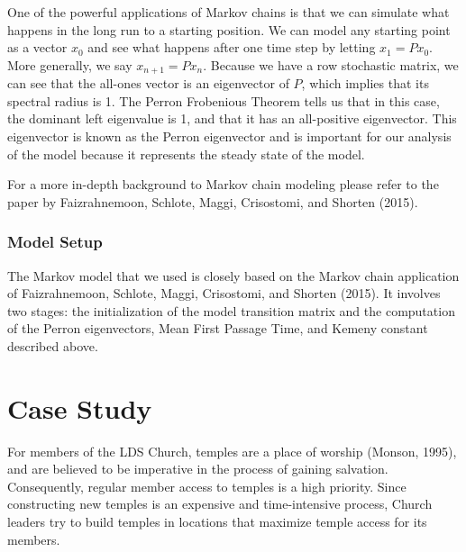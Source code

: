 \documentclass[twoside,twocolumn]{article}
\begin{document}
One of the powerful applications of Markov chains is that we can simulate what happens in the long run to a starting position.
We can model any starting point as a vector $x_0$ and see what happens after one time step by letting $x_1 = P x_0$.
More generally, we say $x_{n + 1} = P x_n$.
Because we have a row stochastic matrix, we can see that the all-ones vector is an eigenvector of $P$, which implies that its spectral radius is 1.
The Perron Frobenious Theorem tells us that in this case, the dominant left eigenvalue is 1, and that it has an all-positive eigenvector.
This eigenvector is known as the Perron eigenvector and is important for our analysis of the model because it represents the steady state of the model.

For a more in-depth background to Markov chain modeling please refer to the paper by Faizrahnemoon, Schlote, Maggi, Crisostomi, and Shorten (2015).

\subsubsection{Model Setup}

The Markov model that we used is closely based on the Markov chain application of Faizrahnemoon, Schlote, Maggi, Crisostomi, and Shorten (2015).
It involves two stages: the initialization of the model transition matrix and the computation of the Perron eigenvectors, Mean First Passage Time, and Kemeny constant described above. %








\section{Case Study}

For members of the LDS Church, temples are a place of worship (Monson, 1995), and are believed to be imperative in the process of gaining salvation.
Consequently, regular member access to temples is a high priority.
Since constructing new temples is an expensive and time-intensive process, Church leaders try to build temples in locations that maximize temple access for its members.
\end{document}
